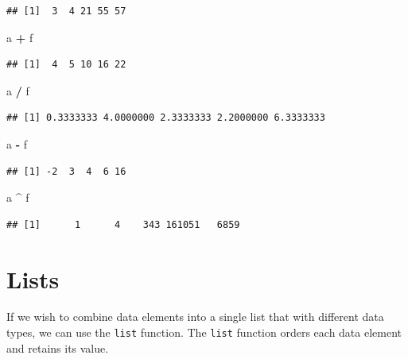 \documentclass[]{book}
\newenvironment{Shaded}{\begin{snugshade}}{\end{snugshade}}
\newcommand{\StringTok}[1]{\textcolor[rgb]{0.31,0.60,0.02}{#1}}
\newcommand{\OperatorTok}[1]{\textcolor[rgb]{0.81,0.36,0.00}{\textbf{#1}}}
\newcommand{\NormalTok}[1]{#1}
\begin{document}
\begin{verbatim}
## [1]  3  4 21 55 57
\end{verbatim}

\begin{Shaded}
\begin{Highlighting}[]
\NormalTok{a }\OperatorTok{+}\StringTok{ }\NormalTok{f}
\end{Highlighting}
\end{Shaded}

\begin{verbatim}
## [1]  4  5 10 16 22
\end{verbatim}

\begin{Shaded}
\begin{Highlighting}[]
\NormalTok{a }\OperatorTok{/}\StringTok{ }\NormalTok{f}
\end{Highlighting}
\end{Shaded}

\begin{verbatim}
## [1] 0.3333333 4.0000000 2.3333333 2.2000000 6.3333333
\end{verbatim}

\begin{Shaded}
\begin{Highlighting}[]
\NormalTok{a }\OperatorTok{-}\StringTok{ }\NormalTok{f}
\end{Highlighting}
\end{Shaded}

\begin{verbatim}
## [1] -2  3  4  6 16
\end{verbatim}

\begin{Shaded}
\begin{Highlighting}[]
\NormalTok{a }\OperatorTok{^}\StringTok{ }\NormalTok{f}
\end{Highlighting}
\end{Shaded}

\begin{verbatim}
## [1]      1      4    343 161051   6859
\end{verbatim}

\section{Lists}\label{lists}

If we wish to combine data elements into a single list that with
different data types, we can use the \texttt{list} function. The
\texttt{list} function orders each data element and retains its value.
\end{document}
